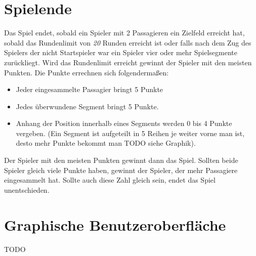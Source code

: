 \documentclass[12pt,a4paper, ngerman, oneside]{scrartcl}
\newcommand{\Rundenlimit}{\emph{20}}
\begin{document}
\section{Spielende}
Das Spiel endet, sobald ein Spieler mit 2 Passagieren ein Zielfeld erreicht hat, sobald das Rundenlimit von \emph{\Rundenlimit} Runden erreicht ist oder falls nach dem Zug des Spielers der nicht Startspieler war ein Spieler vier oder mehr Spielsegmente zurückliegt. Wird das Rundenlimit erreicht gewinnt der Spieler mit den meisten Punkten. Die Punkte errechnen sich folgendermaßen:
\begin{itemize}
\item Jeder eingesammelte Passagier bringt 5 Punkte
\item Jedes überwundene Segment bringt 5 Punkte. 
\item Anhang der Position innerhalb eines Segments werden 0 bis 4 Punkte vergeben. (Ein Segment ist aufgeteilt in 5 Reihen je weiter vorne man ist, desto mehr Punkte bekommt man TODO siehe Graphik).
\end{itemize}
Der Spieler mit den meisten Punkten gewinnt dann das Spiel. Sollten beide Spieler gleich viele Punkte haben, gewinnt der Spieler, der mehr Passagiere eingesammelt hat. Sollte auch diese Zahl gleich sein, endet das Spiel unentschieden.
\section{Graphische Benutzeroberfläche}
TODO
\end{document}
